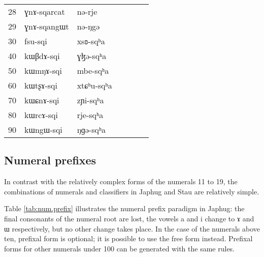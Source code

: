 \documentclass[oldfontcommands,oneside,a4paper,12pt]{article}
\newcommand{\ipa}[1]{{\phon#1}}
\begin{document}
\begin{table}[h]
\begin{tabular}{lllllll}
28	&	\ipa{ɣnɤ-sqarcat}  &	\ipa{nə-rje}  &	\\	
29	&	\ipa{ɣnɤ-sqangɯt}  &	\ipa{nə-ŋgə}  &	\\	
\midrule					
30	&	\ipa{fsu-sqi}  &	\ipa{xsʚ-sqʰa}  &	\\	
40	&	\ipa{kɯβdɤ-sqi}  &	\ipa{ɣɮə-sqʰa}  &	\\	
50	&	\ipa{kɯmŋɤ-sqi}  &	\ipa{mbe-sqʰa}  &	\\	
60	&	\ipa{kɯtʂɤ-sqi}  &	\ipa{xtɕʰu-sqʰa}  &	\\	
70	&	\ipa{kɯɕnɤ-sqi}  &	\ipa{zɲi-sqʰa}  &	\\	
80	&	\ipa{kɯrcɤ-sqi}  &	\ipa{rje-sqʰa}  &	\\	
90	&	\ipa{kɯngɯ-sqi}  &	\ipa{ŋɡə-sqʰa}  &	\\	
\bottomrule
\end{tabular}
\end{table}
		


 \subsection{Numeral prefixes} \label{sec:prefixes.japhug}
 
 In contrast with the relatively complex forms of the numerals 11 to 19, the combinations of numerals and classifiers in Japhug and Stau are relatively simple.
 
Table \ref{tab:num.prefix} illustrates the numeral prefix paradigm in Japhug: the final consonants of the numeral root are lost, the vowels \ipa{a} and \ipa{i} change to \ipa{ɤ} and \ipa{ɯ} respectively, but no other change takes place. In the case of the numerals above ten, prefixal form is optional; it is possible to use the free form instead. Prefixal forms for other numerals under 100 can be generated with the same rules.
 
\end{document}
